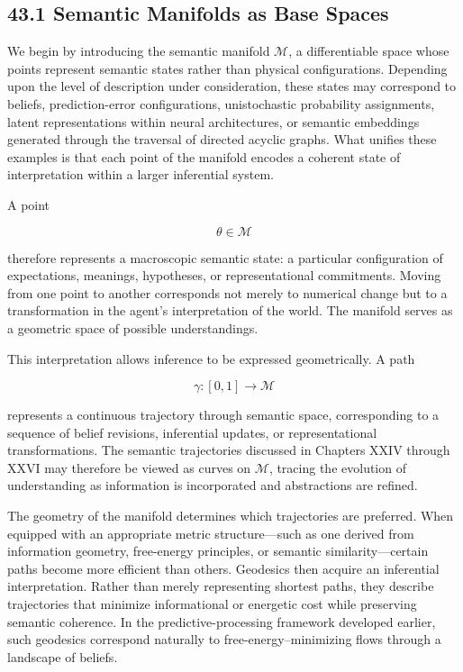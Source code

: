 \documentclass[12pt,letterpaper]{article}
\theoremstyle{remark}
\begin{document}
\subsection{43.1 Semantic Manifolds as Base Spaces}

We begin by introducing the semantic manifold $\mathcal{M}$, a differentiable space whose points represent semantic states rather than physical configurations. Depending upon the level of description under consideration, these states may correspond to beliefs, prediction-error configurations, unistochastic probability assignments, latent representations within neural architectures, or semantic embeddings generated through the traversal of directed acyclic graphs. What unifies these examples is that each point of the manifold encodes a coherent state of interpretation within a larger inferential system.

A point

\[
\theta \in \mathcal{M}
\]

therefore represents a macroscopic semantic state: a particular configuration of expectations, meanings, hypotheses, or representational commitments. Moving from one point to another corresponds not merely to numerical change but to a transformation in the agent's interpretation of the world. The manifold serves as a geometric space of possible understandings.

This interpretation allows inference to be expressed geometrically. A path

\[
\gamma : [0,1] \to \mathcal{M}
\]

represents a continuous trajectory through semantic space, corresponding to a sequence of belief revisions, inferential updates, or representational transformations. The semantic trajectories discussed in Chapters XXIV through XXVI may therefore be viewed as curves on $\mathcal{M}$, tracing the evolution of understanding as information is incorporated and abstractions are refined.

The geometry of the manifold determines which trajectories are preferred. When equipped with an appropriate metric structure—such as one derived from information geometry, free-energy principles, or semantic similarity—certain paths become more efficient than others. Geodesics then acquire an inferential interpretation. Rather than merely representing shortest paths, they describe trajectories that minimize informational or energetic cost while preserving semantic coherence. In the predictive-processing framework developed earlier, such geodesics correspond naturally to free-energy–minimizing flows through a landscape of beliefs.
\end{document}
